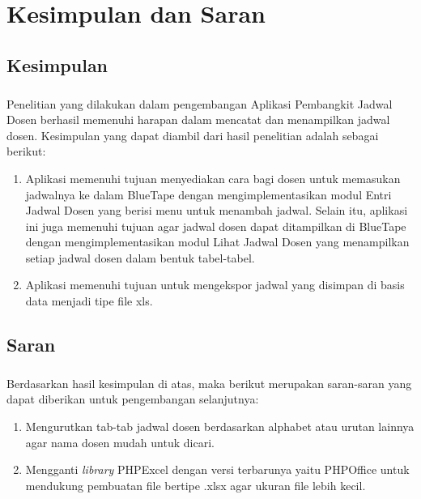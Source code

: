 \chapter{Kesimpulan dan Saran}
\section{Kesimpulan}
\paragraph{} Penelitian yang dilakukan dalam pengembangan Aplikasi Pembangkit Jadwal Dosen berhasil memenuhi harapan dalam mencatat dan menampilkan jadwal dosen. Kesimpulan yang dapat diambil dari hasil penelitian adalah sebagai berikut:
\begin{enumerate}
	\item Aplikasi memenuhi tujuan menyediakan cara bagi dosen untuk memasukan jadwalnya ke dalam BlueTape dengan mengimplementasikan modul Entri Jadwal Dosen yang berisi menu untuk menambah jadwal. Selain itu, aplikasi ini juga memenuhi tujuan agar jadwal dosen dapat ditampilkan di BlueTape dengan mengimplementasikan modul Lihat Jadwal Dosen yang menampilkan setiap jadwal dosen dalam bentuk tabel-tabel.
	\item Aplikasi memenuhi tujuan untuk mengekspor jadwal yang disimpan di basis data menjadi tipe file xls.
\end{enumerate}

\section{Saran}
\paragraph{}Berdasarkan hasil kesimpulan di atas, maka berikut merupakan saran-saran yang dapat diberikan untuk pengembangan selanjutnya:
\begin{enumerate}
	\item Mengurutkan tab-tab jadwal dosen berdasarkan alphabet atau urutan lainnya agar nama dosen mudah untuk dicari.
	\item Mengganti \textit{library} PHPExcel dengan versi terbarunya yaitu PHPOffice untuk mendukung pembuatan file bertipe .xlsx agar ukuran file lebih kecil.
\end{enumerate}
